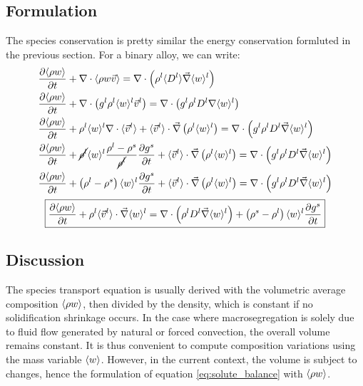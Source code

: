 \subsection{Formulation}
The species conservation is pretty similar the energy conservation formluted in the previous section. For a binary alloy, we can write:
\begin{subequations}
\begin{align}
	& \frac{\partial \langle \rho w \rangle}{\partial t} + \nabla \cdot \langle \rho w \vec{v} \rangle 
	= \nabla  \cdot \left( \rho^l \langle D^l \rangle \vec{\nabla} \langle w \rangle^l  \right) \\
	& \frac{\partial \langle \rho w \rangle}{\partial t} + \nabla \cdot \left( {g^l} \rho^l \langle w \rangle^l \vec{v}^l \right)
	= \nabla  \cdot \left( {g^l}\rho^l D^l \nabla \langle w \rangle^l  \right) \\ 
	& \frac{\partial \langle \rho w \rangle}{\partial t} 
		+ \rho^l \langle w \rangle^l  \nabla \cdot \langle \vec{v}^l \rangle
		+ \langle \vec{v}^l \rangle \cdot \vec{\nabla} \left( \rho^l \langle w \rangle^l \right)
		= \nabla  \cdot \left( {g^l} \rho^l D^l \vec{\nabla} \langle w \rangle^l  \right) \\   
	& \frac{\partial \langle \rho w \rangle}{\partial t} 
		+ \cancel{\rho^l} \langle w \rangle^l  \frac{\rho^l-\rho^s}{\cancel{\rho^l}} \frac{\partial  {g^s} }{\partial t}
		+ \langle \vec{v}^l \rangle \cdot \vec{\nabla} \left( \rho^l \langle w \rangle^l \right)
		= \nabla  \cdot \left( {g^l} \rho^l D^l \vec{\nabla} \langle w \rangle^l  \right) \\ 
	& \frac{\partial \langle \rho w \rangle}{\partial t} 
		+ \left( \rho^l-\rho^s \right) \langle w \rangle^l \frac{\partial  {g^s} }{\partial t}
		+ \langle \vec{v}^l \rangle \cdot \vec{\nabla} \left( \rho^l \langle w \rangle^l \right)
		= \nabla  \cdot \left( {g^l} \rho^l D^l \vec{\nabla} \langle w \rangle^l  \right)        
\end{align}
\end{subequations}
\begin{align}
\label{eq:solute_balance}
 \boxed{ \frac{\partial \langle \rho w \rangle}{\partial t} 
		+ \rho^l \langle \vec{v}^l \rangle \cdot \vec{\nabla} \langle w \rangle^l
		= \nabla  \cdot \left( \rho^l D^l \vec{\nabla} \langle w \rangle^l  \right)
		+ \left( \rho^s-\rho^l \right) \langle w \rangle^l \frac{\partial  {g^s}}{\partial t}}
\end{align}
\subsection{Discussion}
The species transport equation is usually derived with the volumetric average composition $\langle \rho w \rangle$, then
divided by the density, which is constant if no solidification shrinkage occurs. In the case where macrosegregation
is solely due to fluid flow generated by natural or forced convection, the overall
volume remains constant. It is thus convenient to compute composition variations using the mass variable $\langle w \rangle$.
However, in the current context, the volume is subject to changes, hence the formulation of equation 
\eqref{eq:solute_balance} with $\langle \rho w \rangle$.